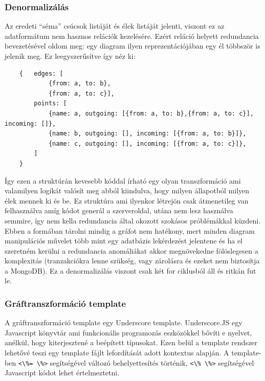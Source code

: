 \subsubsection{Denormalizálás}

Az eredeti ``séma'' csúcsok listáját és élek listáját jelenti, viszont ez az adatformátum nem hasznos relációk kezelésére. Ezért reláció helyett redundancia bevezetésével oldom meg: egy diagram ilyen reprezentációjában egy él többször is jelenik meg. Ez leegyszerűsítve így néz ki:

\begin{lstlisting}
    {   edges: [
            {from: a, to: b},
            {from: a, to: c}],
        points: [
            {name: a, outgoing: [{from: a, to: b},{from: a, to: c}], incoming: []},
            {name: b, outgoing: [], incoming: [{from: a, to: b}]},
            {name: c, outgoing: [], incoming: [{from: a, to: c}]},
        ]
    }
\end{lstlisting}

Így ezen a struktúrán kevesebb kóddal írható egy olyan transzformáció ami valamilyen logikát valósít meg abból kiindulva, hogy milyen állapotból milyen élek mennek ki és be. Ez struktúra ami ilyenkor létrejön csak átmenetileg van felhasználva amíg kódot generál a szerveroldal, utána nem lesz használva semmire, így nem kella redundancia által okozott szokásos próblémákkal küzdeni. Ebben a formában tárolni mindig a gráfot nem hatékony, mert minden diagram manipulációs művelet több mint egy adatbázis lekérdezést jelentene és ha el szeretném kerülni a redundancia anomáliákat 
akkor megnövekedne fölöslegesen a komplexitás (tranzakciókra lenne szükség, vagy zárolásra és ezeket nem biztosítja a MongoDB). Ez a denormalizálás viszont csak két for ciklusból áll és ritkán fut le. 

\subsubsection{Gráftranszformáció template}

A gráftranszformáció template egy Underscore template. Underscore.JS egy Javascript könyvtár ami funkcionális programozás eszközökkel bővíti e nyelvet, anélkül, hogy kiterjesztené a beépített típusokat. \cite{underscorejs.org}
Ezen belül a template rendszer lehetővé teszi egy template fájlt lefordítását adott kontextus alapján. A template-ben \lstinline{<\%= \%>} segítségével változó behelyettesítés történik, \lstinline{<\% \%>} segítségével Javascript kódot lehet értelmeztetni. 

